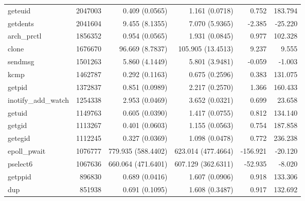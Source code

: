 \begin{longtable}{>{\ttfamily}lrrrrr}
                        geteuid &    2047003 &              0.409 (0.0565) &            1.161 (0.0718) &           0.752 &      183.794 \\
                       getdents &    2041604 &              9.455 (8.1355) &            7.070 (5.9365) &          -2.385 &      -25.220 \\
                    arch\_prctl &    1856352 &              0.954 (0.0565) &            1.931 (0.0845) &           0.977 &      102.328 \\
                          clone &    1676670 &             96.669 (8.7837) &         105.905 (13.4513) &           9.237 &        9.555 \\
                        sendmsg &    1501263 &              5.860 (4.1449) &            5.801 (3.9481) &          -0.059 &       -1.003 \\
                           kcmp &    1462787 &              0.292 (0.1163) &            0.675 (0.2596) &           0.383 &      131.075 \\
                         getpid &    1372837 &              0.851 (0.0989) &            2.217 (0.2570) &           1.366 &      160.433 \\
            inotify\_add\_watch &    1254338 &              2.953 (0.0469) &            3.652 (0.0321) &           0.699 &       23.658 \\
                         getuid &    1149763 &              0.605 (0.0390) &            1.417 (0.0755) &           0.812 &      134.140 \\
                         getgid &    1113267 &              0.401 (0.0603) &            1.155 (0.0563) &           0.754 &      187.858 \\
                        getegid &    1112245 &              0.327 (0.0369) &            1.098 (0.0478) &           0.772 &      236.238 \\
                   epoll\_pwait &    1076777 &          779.935 (588.4402) &        623.014 (477.4664) &        -156.921 &      -20.120 \\
                       pselect6 &    1067636 &          660.064 (471.6401) &        607.129 (362.6311) &         -52.935 &       -8.020 \\
                        getppid &     896830 &              0.689 (0.0416) &            1.607 (0.0906) &           0.918 &      133.306 \\
                            dup &     851938 &              0.691 (0.1095) &            1.608 (0.3487) &           0.917 &      132.692 \\

\end{longtable}
